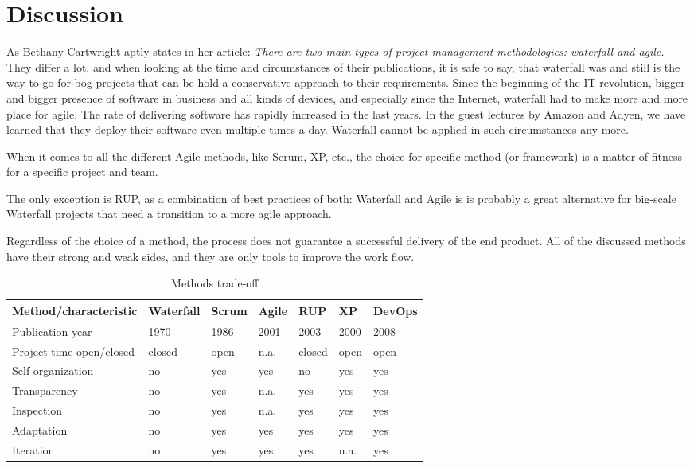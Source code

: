 \section{Discussion}

As Bethany Cartwright aptly states in her article\cite{cartwright_2015}: \textit{There are two main types of project management methodologies: waterfall and agile.} They differ a lot, and when looking at the time and circumstances of their publications, it is safe to say, that waterfall was and still is the way to go for bog projects that can be hold a conservative approach to their requirements. Since the beginning of the IT revolution, bigger and bigger presence of software in business and all kinds of devices, and especially since the Internet, waterfall had to make more and more place for agile. The rate of delivering software has rapidly increased in the last years. In the guest lectures by Amazon and Adyen, we have learned that they deploy their software even multiple times a day. Waterfall cannot be applied in such circumstances any more. 

When it comes to all the different Agile methods, like Scrum, XP, etc., the choice for specific method (or framework) is a matter of fitness for a specific project and team. 

The only exception is RUP, as a combination of best practices of both: Waterfall and Agile is is probably a great alternative for big-scale Waterfall projects that need a transition to a more agile approach.

Regardless of the choice of a method, the process does not guarantee a successful delivery of the end product. All of the discussed methods have their strong and weak sides, and they are only tools to improve the work flow.

\begin{table}[]
\centering
\caption{Methods trade-off}
\label{methods-trede-off}

\begin{tabular}{@{}lllllll@{}}
\toprule
Method/characteristic    & Waterfall & Scrum & Agile & RUP    & XP & DevOps \\ \midrule
Publication year         & 1970      & 1986  & 2001  & 2003   & 2000                & 2008   \\
Project time open/closed & closed    & open  & n.a.  & closed & open                & open   \\
Self-organization        & no        & yes   & yes   & no     & yes                 & yes    \\
Transparency             & no        & yes   & n.a.  & yes    & yes                 & yes    \\
Inspection               & no        & yes   & n.a.  & yes    & yes                 & yes    \\
Adaptation               & no        & yes   & yes   & yes    & yes                 & yes    \\
Iteration                & no        & yes   & yes   & yes    & n.a.                & yes    \\ \bottomrule
\end{tabular}
\end{table}


\printbibliography


